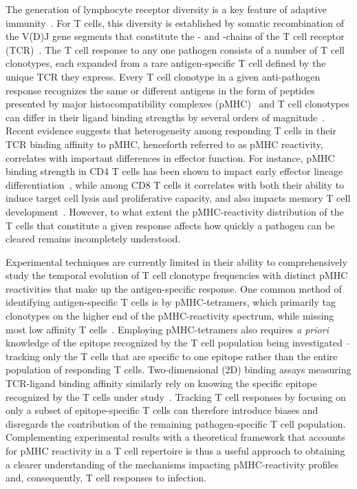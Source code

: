 The generation of lymphocyte receptor diversity is a key feature of adaptive immunity~\cite{cooper2006evolution,schatz2011recombination}. For T cells, this diversity is established by somatic recombination of the V(D)J gene segments that constitute the \textalpha- and \textbeta-chains of the T cell receptor (TCR)~\cite{schatz2011recombination}. The T cell response to any one pathogen consists of a number of T cell clonotypes, each expanded from a rare antigen-specific T cell defined by the unique TCR they express. Every T cell clonotype in a given anti-pathogen response recognizes the same or different antigens in the form of peptides presented by major histocompatibility complexes (pMHC)~\cite{yassai2009clonotype} and T cell clonotypes can differ in their ligand binding strengths by several orders of magnitude~\cite{andargachew2018cd4,kolawole2020relationship}. Recent evidence suggests that heterogeneity among responding T cells in their TCR binding affinity to pMHC, henceforth referred to as pMHC reactivity, correlates with important differences in effector function. For instance, pMHC binding strength in CD4\pos{} T cells has been shown to impact early effector lineage differentiation~\cite{snook2018tcr,ditoro2018differential,van2016tcr}, while among CD8\pos{} T cells it correlates with both their ability to induce target cell lysis and proliferative capacity, and also impacts memory T cell development~\cite{kolawole2020relationship}. However, to what extent the pMHC-reactivity distribution of the T cells that constitute a given response affects how quickly a pathogen can be cleared remains incompletely understood.

Experimental techniques are currently limited in their ability to comprehensively study the temporal evolution of T cell clonotype frequencies with distinct pMHC reactivities that make up the antigen-specific response. One common method of identifying antigen-specific T cells is by pMHC-tetramers, which primarily tag clonotypes on the higher end of the pMHC-reactivity spectrum, while missing most low affinity T cells~\cite{andargachew2018cd4}. Employing pMHC-tetramers also requires \textit{a priori} knowledge of the epitope recognized by the T cell population being investigated – tracking only the T cells that are specific to one epitope rather than the entire population of responding T cells. Two-dimensional (2D) binding assays measuring TCR-ligand binding affinity similarly rely on knowing the specific epitope recognized by the T cells under study~\cite{huang2010kinetics}. Tracking T cell responses by focusing on only a subset of epitope-specific T cells can therefore introduce biases and disregards the contribution of the remaining pathogen-specific T cell population. Complementing experimental results with a theoretical framework that accounts for pMHC reactivity in a T cell repertoire is thus a useful approach to obtaining a clearer understanding of the mechanisms impacting pMHC-reactivity profiles and, consequently, T cell responses to infection.

